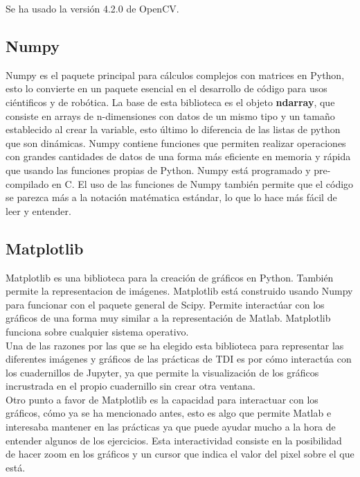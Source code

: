 \documentclass[a4paper,12pt]{report}
\begin{document}
Se ha usado la versión 4.2.0 de OpenCV.\\


\subsection{Numpy}

Numpy es el paquete principal para cálculos complejos con matrices en Python, esto lo convierte en un paquete esencial en el desarrollo de código para usos ciéntificos y de robótica. La base de esta biblioteca es el objeto \textbf{ndarray}, que consiste en arrays de n-dimensiones con datos de un mismo tipo y un tamaño establecido al crear la variable, esto último lo diferencia de las listas de python que son dinámicas. Numpy contiene funciones que permiten realizar operaciones con grandes cantidades de datos de una forma más eficiente en memoria y rápida que usando las funciones propias de Python. Numpy está programado y pre-compilado en C. El uso de las funciones de Numpy también permite que el código se parezca más a la notación matématica estándar, lo que lo hace más fácil de leer y entender.\\

\subsection{Matplotlib}

Matplotlib es una biblioteca para la creación de gráficos en Python. También permite la representacion de imágenes. Matplotlib está construido usando Numpy para funcionar con el paquete general de Scipy. Permite interactúar con los gráficos de una forma muy similar a la representación de Matlab. Matplotlib funciona sobre cualquier sistema operativo. \\

Una de las razones por las que se ha elegido esta biblioteca para representar las diferentes imágenes y gráficos de las prácticas de TDI es por cómo interactúa con los cuadernillos de Jupyter, ya que permite la visualización de los gráficos incrustrada en el propio cuadernillo sin crear otra ventana. \\

Otro punto a favor de Matplotlib es la capacidad para interactuar con los gráficos, cómo ya se ha mencionado antes, esto es algo que permite Matlab e interesaba mantener en las prácticas ya que puede ayudar mucho a la hora de entender algunos de los ejercicios. Esta interactividad consiste en la posibilidad de hacer zoom en los gráficos y un cursor que indica el valor del pixel sobre el que está.
\end{document}
